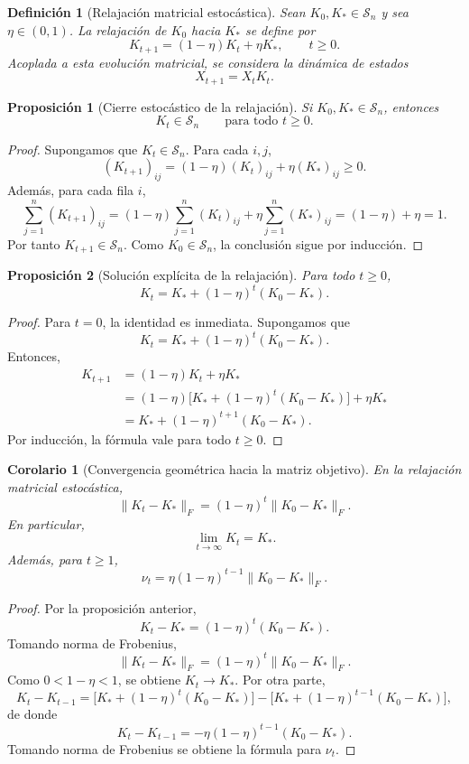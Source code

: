 \documentclass[12pt]{article}
\newtheorem{definicion}{Definición}[section]
\newtheorem{proposicion}{Proposición}[section]
\newtheorem{corolario}{Corolario}[section]
\begin{document}
\begin{definicion}[Relajación matricial estocástica]
Sean \(K_0,K_\ast\in\mathcal S_n\) y sea \(\eta\in(0,1)\). La relajación de
\(K_0\) hacia \(K_\ast\) se define por
\[
K_{t+1}=(1-\eta)K_t+\eta K_\ast,
\qquad t\geq 0.
\]
Acoplada a esta evolución matricial, se considera la dinámica de estados
\[
X_{t+1}=X_tK_t.
\]
\end{definicion}

\begin{proposicion}[Cierre estocástico de la relajación]
Si \(K_0,K_\ast\in\mathcal S_n\), entonces
\[
K_t\in\mathcal S_n
\qquad
\text{para todo }t\geq 0.
\]
\end{proposicion}

\begin{proof}
Supongamos que \(K_t\in\mathcal S_n\). Para cada \(i,j\),
\[
(K_{t+1})_{ij}
=
(1-\eta)(K_t)_{ij}+\eta(K_\ast)_{ij}
\geq 0.
\]
Además, para cada fila \(i\),
\[
\sum_{j=1}^n (K_{t+1})_{ij}
=
(1-\eta)\sum_{j=1}^n(K_t)_{ij}
+
\eta\sum_{j=1}^n(K_\ast)_{ij}
=
(1-\eta)+\eta
=
1.
\]
Por tanto \(K_{t+1}\in\mathcal S_n\). Como \(K_0\in\mathcal S_n\), la
conclusión sigue por inducción.
\end{proof}

\begin{proposicion}[Solución explícita de la relajación]
Para todo \(t\geq 0\),
\[
K_t
=
K_\ast+(1-\eta)^t(K_0-K_\ast).
\]
\end{proposicion}

\begin{proof}
Para \(t=0\), la identidad es inmediata. Supongamos que
\[
K_t=K_\ast+(1-\eta)^t(K_0-K_\ast).
\]
Entonces,
\begin{align*}
K_{t+1}
&=(1-\eta)K_t+\eta K_\ast\\
&=(1-\eta)\bigl[K_\ast+(1-\eta)^t(K_0-K_\ast)\bigr]+\eta K_\ast\\
&=K_\ast+(1-\eta)^{t+1}(K_0-K_\ast).
\end{align*}
Por inducción, la fórmula vale para todo \(t\geq 0\).
\end{proof}

\begin{corolario}[Convergencia geométrica hacia la matriz objetivo]
En la relajación matricial estocástica,
\[
\|K_t-K_\ast\|_F
=
(1-\eta)^t\|K_0-K_\ast\|_F.
\]
En particular,
\[
\lim_{t\to\infty}K_t=K_\ast.
\]
Además, para \(t\geq 1\),
\[
\nu_t
=
\eta(1-\eta)^{t-1}\|K_0-K_\ast\|_F.
\]
\end{corolario}

\begin{proof}
Por la proposición anterior,
\[
K_t-K_\ast=(1-\eta)^t(K_0-K_\ast).
\]
Tomando norma de Frobenius,
\[
\|K_t-K_\ast\|_F
=
(1-\eta)^t\|K_0-K_\ast\|_F.
\]
Como \(0<1-\eta<1\), se obtiene \(K_t\to K_\ast\). Por otra parte,
\[
K_t-K_{t-1}
=
\bigl[K_\ast+(1-\eta)^t(K_0-K_\ast)\bigr]
-
\bigl[K_\ast+(1-\eta)^{t-1}(K_0-K_\ast)\bigr],
\]
de donde
\[
K_t-K_{t-1}
=
-\eta(1-\eta)^{t-1}(K_0-K_\ast).
\]
Tomando norma de Frobenius se obtiene la fórmula para \(\nu_t\).
\end{proof}
\end{document}

